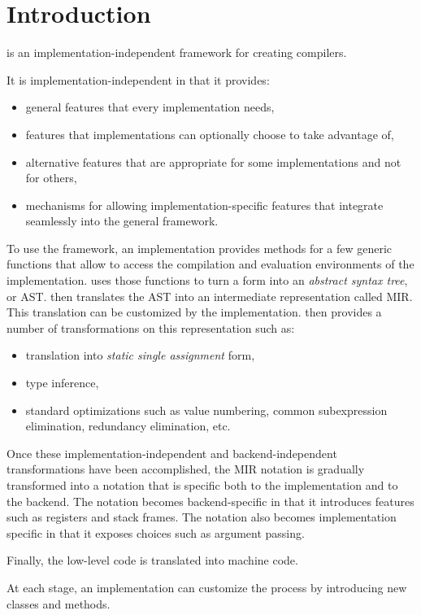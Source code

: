 \chapter{Introduction}
%

\sysname{} is an implementation-independent framework for creating
\commonlisp{} compilers. 

It is implementation-independent in that it provides:

\begin{itemize}
\item general features that every implementation needs,
\item features that implementations can optionally choose to take
  advantage of, 
\item alternative features that are appropriate for some
  implementations and not for others,
\item mechanisms for allowing implementation-specific features that
  integrate seamlessly into the general framework.
\end{itemize}

To use the framework, an implementation provides methods for a few
generic functions that allow \sysname{} to access the compilation and
evaluation environments of the implementation.  \sysname{} uses those
functions to turn a form into an \emph{abstract syntax tree}, or AST.
 \sysname{} then translates the AST
into an intermediate representation called MIR.  
This translation can be customized by the implementation.  \sysname{}
then provides a number of transformations on this representation such
as:

\begin{itemize}
\item translation into \emph{static single assignment} form,
\item type inference,
\item standard optimizations such as value numbering, common
  subexpression elimination, redundancy elimination, etc.
\end{itemize}

Once these implementation-independent and backend-independent
transformations have been accomplished, the MIR notation is gradually
transformed into a notation that is specific both to the
implementation and to the backend.  The notation becomes
backend-specific in that it introduces features such as registers and
stack frames.  The notation also becomes implementation specific in
that it exposes choices such as argument passing.

Finally, the low-level code is translated into machine code.

At each stage, an implementation can customize the process by
introducing new classes and methods. 
